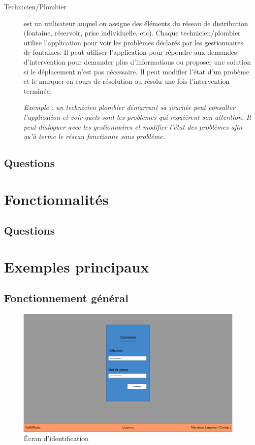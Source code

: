 \documentclass[a4paper, 11pt]{article}
\begin{document}
\begin{description}
    \item[Technicien/Plombier] est un utilisateur auquel on assigne des éléments du réseau de distribution (fontaine, réservoir, prise individuelle, etc). Chaque technicien/plombier utilise l'application pour voir les problèmes déclarés par les gestionnaires de fontaines. Il peut utiliser l'application pour répondre aux demandes d'intervention pour demander plus d'informations ou proposer une solution si le déplacement n'est pas nécessaire. Il peut modifier l'état d'un probème et le marquer en cours de résolution ou résolu une fois l'intervention terminée.

    \emph{Exemple : un technicien plombier démarrant sa journée peut consulter l'application et voir quels sont les problèmes qui requièrent son attention. Il peut dialoguer avec les gestionnaires et modifier l'état des problèmes afin qu'à terme le réseau fonctionne sans problème.}
  \end{description}
  \subsection{Questions}
\section{Fonctionnalités}
  \subsection{Questions}
\section{Exemples principaux}
  \subsection{Fonctionnement général}
    \begin{figure}[H]
        \includegraphics[width=\textwidth]{Cahier_des_Charges/login}
        \caption{\'Ecran d'identification}
        \label{fig:login}
    \end{figure}
\end{document}
